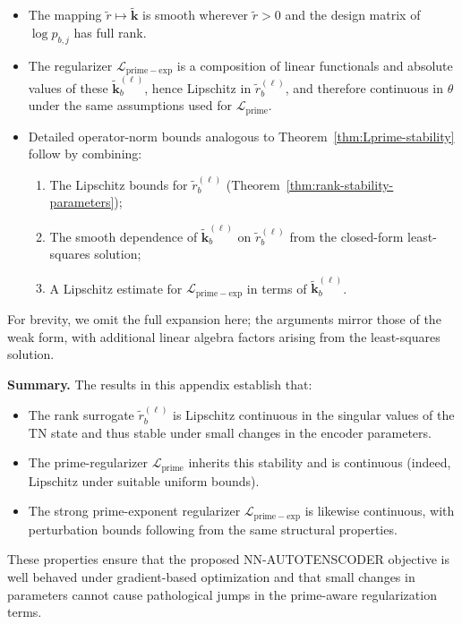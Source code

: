 \documentclass[11pt]{article}
\begin{document}
\begin{itemize}
    \item The mapping $\tilde{r} \mapsto \tilde{\mathbf{k}}$ is smooth wherever $\tilde{r}>0$ and the design matrix of $\log p_{b,j}$ has full rank.

    \item The regularizer $\mathcal{L}_{\mathrm{prime-exp}}$ is a composition of linear functionals and absolute values of these $\tilde{\mathbf{k}}_b^{(\ell)}$, hence Lipschitz in $\tilde{r}_b^{(\ell)}$, and therefore continuous in $\theta$ under the same assumptions used for $\mathcal{L}_{\mathrm{prime}}$.

    \item Detailed operator-norm bounds analogous to Theorem~\ref{thm:Lprime-stability} follow by combining:
    \begin{enumerate}
        \item The Lipschitz bounds for $\tilde{r}_b^{(\ell)}$ (Theorem~\ref{thm:rank-stability-parameters});
        \item The smooth dependence of $\tilde{\mathbf{k}}_b^{(\ell)}$ on $\tilde{r}_b^{(\ell)}$ from the closed-form least-squares solution;
        \item A Lipschitz estimate for $\mathcal{L}_{\mathrm{prime-exp}}$ in terms of $\tilde{\mathbf{k}}_b^{(\ell)}$.
    \end{enumerate}
\end{itemize}

For brevity, we omit the full expansion here; the arguments mirror those of the weak form, with additional linear algebra factors arising from the least-squares solution.

\bigskip

\noindent\textbf{Summary.} The results in this appendix establish that:
\begin{itemize}
    \item The rank surrogate $\tilde{r}_b^{(\ell)}$ is Lipschitz continuous in the singular values of the TN state and thus stable under small changes in the encoder parameters.
    \item The prime-regularizer $\mathcal{L}_{\mathrm{prime}}$ inherits this stability and is continuous (indeed, Lipschitz under suitable uniform bounds).
    \item The strong prime-exponent regularizer $\mathcal{L}_{\mathrm{prime-exp}}$ is likewise continuous, with perturbation bounds following from the same structural properties.
\end{itemize}
These properties ensure that the proposed NN-AUTOTENSCODER objective is well behaved under gradient-based optimization and that small changes in parameters cannot cause pathological jumps in the prime-aware regularization terms.


\nocite{*}
  

\end{document}

